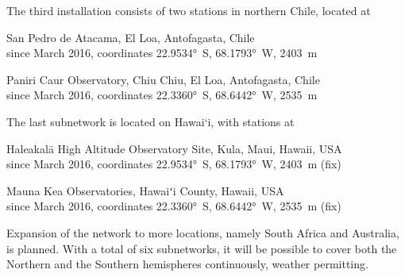         The third installation consists of two stations in northern Chile, located at
        \begin{description}[leftmargin = 25mm]
            \item[SP]       San Pedro de Atacama, El Loa, Antofagasta, Chile\\
                            since March 2016, coordinates \ang{22.9534}~S, \ang{68.1793}~W, \SI{2403}{\metre}
            \item[PC]       Paniri Caur Observatory, Chiu Chiu, El Loa, Antofagasta, Chile\\
                            since March 2016, coordinates \ang{22.3360}~S, \ang{68.6442}~W, \SI{2535}{\metre}
        \end{description}

        The last subnetwork is located on Hawai`i, with stations at
        \begin{description}[leftmargin = 25mm]
            \item[HK]       Haleakalā High Altitude Observatory Site, Kula, Maui, Hawaii, USA\\
                            since March 2016, coordinates \ang{22.9534}~S, \ang{68.1793}~W, \SI{2403}{\metre} (fix)
            \item[MK]       Mauna Kea Observatories, Hawaiʻi County, Hawaii, USA\\
                            since March 2016, coordinates \ang{22.3360}~S, \ang{68.6442}~W, \SI{2535}{\metre} (fix)
        \end{description}


        Expansion of the network to more locations, namely South Africa and Australia, is planned.
        With a total of six subnetworks, it will be possible to cover both the Northern and
        the Southern hemispheres continuously, weather permitting.
